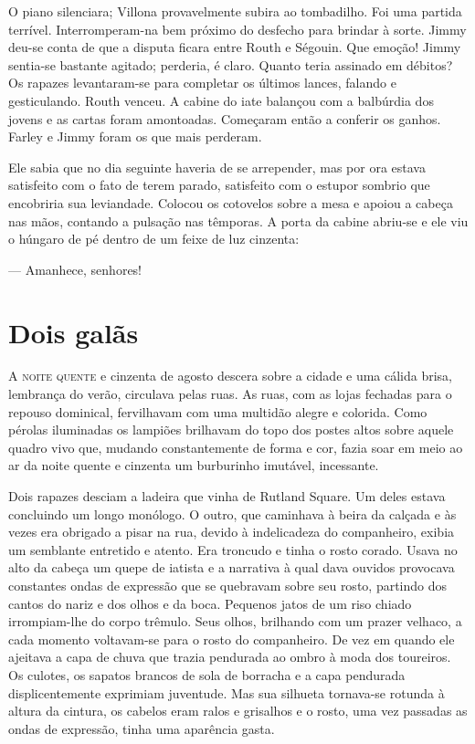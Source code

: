 O piano silenciara; Villona provavelmente subira ao tombadilho.  Foi uma
partida terrível.  Interromperam-na bem próximo do desfecho para brindar à
sorte.  Jimmy deu-se conta de que a disputa ficara entre Routh e Ségouin.  Que
emoção!  Jimmy sentia-se bastante agitado; perderia, é claro.  Quanto teria
assinado em débitos?  Os rapazes levantaram-se para completar os últimos
lances, falando e gesticulando.  Routh venceu.  A cabine do iate balançou com a
balbúrdia dos jovens e as cartas foram amontoadas.  Começaram então a conferir
os ganhos.  Farley e Jimmy foram os que mais perderam.

Ele sabia que no dia seguinte haveria de se arrepender, mas por ora estava
satisfeito com o fato de terem parado, satisfeito com o estupor sombrio que
encobriria sua leviandade.  Colocou os cotovelos sobre a mesa e apoiou a cabeça
nas mãos, contando a pulsação nas têmporas.  A porta da cabine abriu-se e ele
viu o húngaro de pé dentro de um feixe de luz cinzenta:

--- Amanhece, senhores!


\chapter{Dois galãs}

\textsc{A noite quente} e cinzenta de agosto descera sobre a cidade e uma
cálida brisa, lembrança do verão, circulava pelas ruas.  As ruas, com as lojas
fechadas para o repouso dominical, fervilhavam com uma multidão alegre e
colorida.  Como pérolas iluminadas os lampiões brilhavam do topo dos postes
altos sobre aquele quadro vivo que, mudando constantemente de forma e cor,
fazia soar em meio ao ar da noite quente e cinzenta um burburinho imutável,
incessante.

Dois rapazes desciam a ladeira que vinha de Rutland Square.  Um deles estava
concluindo um longo monólogo.  O outro, que caminhava à beira da calçada e às
vezes era obrigado a pisar na rua, devido à indelicadeza do companheiro, exibia
um semblante entretido e atento.  Era troncudo e tinha o rosto corado.  Usava
no alto da cabeça um quepe de iatista e a narrativa à qual dava ouvidos
provocava constantes ondas de expressão que se quebravam sobre seu rosto,
partindo dos cantos do nariz e dos olhos e da boca.  Pequenos jatos de um riso
chiado irrompiam-lhe do corpo trêmulo.  Seus olhos, brilhando com um prazer
velhaco, a cada momento voltavam-se para o rosto do companheiro.  De vez em
quando ele ajeitava a capa de chuva que trazia pendurada ao ombro à moda dos
toureiros.  Os culotes, os sapatos brancos de sola de borracha e a capa
pendurada displicentemente exprimiam juventude.  Mas sua silhueta tornava-se
rotunda à altura da cintura, os cabelos eram ralos e grisalhos e o rosto, uma
vez passadas as ondas de expressão, tinha uma aparência gasta.

